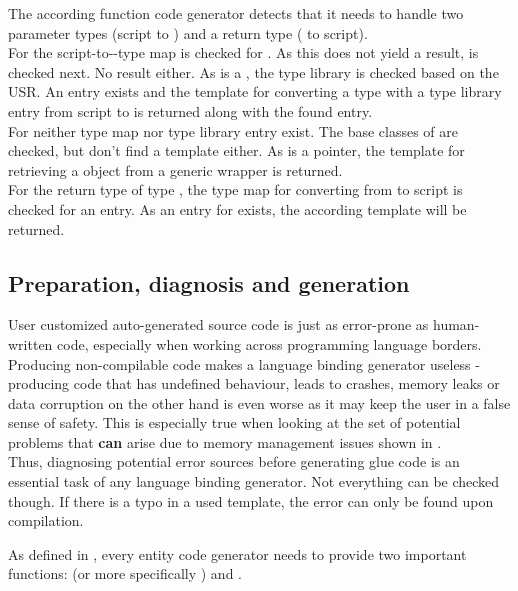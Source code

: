 The according function code generator detects that it needs to handle two parameter types (script to ) and a return type ( to script).\\
For  the script-to--type map is checked for . As this does not yield a result,  is checked next. No result either. As  is a , the type library is checked based on the USR. An entry exists and the template for converting a type with a type library entry from script to  is returned along with the found entry.\\
For  neither type map nor type library entry exist. The base classes of  are checked, but don't find a template either. As  is a pointer, the template for retrieving a  object from a generic wrapper is returned.\\
For the return type of type , the type map for converting from  to script is checked for an entry. As an entry for  exists, the according template will be returned.

\subsection{Preparation, diagnosis and generation}

User customized auto-generated source code is just as error-prone as human-written code, especially when working across programming language borders. Producing non-compilable code makes a language binding generator useless - producing code that has undefined behaviour, leads to crashes, memory leaks or data corruption on the other hand is even worse as it may keep the user in a false sense of safety. This is especially true when looking at the set of potential problems that \textbf{can} arise due to memory management issues shown in .\\
Thus, diagnosing potential error sources before generating glue code is an essential task of any language binding generator. Not everything can be checked though. If there is a typo in a used template, the error can only be found upon compilation.

As defined in , every entity code generator needs to provide two important functions:  (or more specifically \linebreak{}) and .

